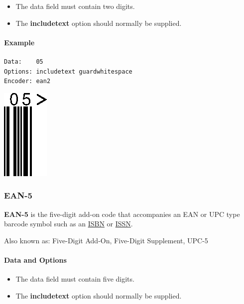 \begin{itemize}
\tightlist
\item
  The data field must contain two digits.
\item
  The \textbf{includetext} option should normally be supplied.
\end{itemize}

\hypertarget{example-23}{%
\paragraph{Example}\label{example-23}}

\begin{verbatim}
Data:    05
Options: includetext guardwhitespace
Encoder: ean2
\end{verbatim}

\includegraphics{images/ean2-1.eps}

\hypertarget{ean-5}{%
\subsubsection{EAN-5}\label{ean-5}}

\textbf{EAN-5} is the five-digit add-on code that accompanies an EAN or
UPC type barcode symbol such as an \protect\hyperlink{isbn}{ISBN} or
\protect\hyperlink{issn}{ISSN}.

Also known as: Five-Digit Add-On, Five-Digit Supplement, UPC-5

\hypertarget{data-and-options-84}{%
\paragraph{Data and Options}\label{data-and-options-84}}

\begin{itemize}
\tightlist
\item
  The data field must contain five digits.
\item
  The \textbf{includetext} option should normally be supplied.
\end{itemize}

